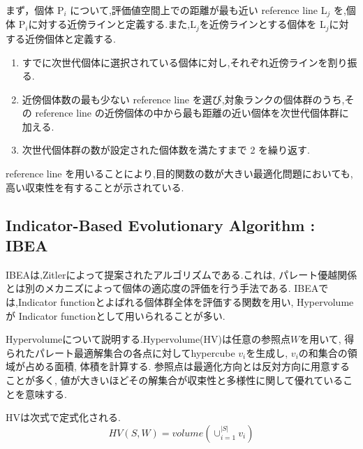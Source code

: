 \documentclass[12pt,a4j,notitlepage]{jreport}
\begin{document}
まず，個体 P$_i$ について,評価値空間上での距離が最も近い reference line L$_j$ を,個体 P$_i$に対する近傍ラインと定義する.また,L$_j$を近傍ラインとする個体を L$_j$に対する近傍個体と定義する.

\begin{enumerate}
\item すでに次世代個体に選択されている個体に対し,それぞれ近傍ラインを割り振る.
\item 近傍個体数の最も少ない reference line を選び,対象ランクの個体群のうち,その reference line の近傍個体の中から最も距離の近い個体を次世代個体群に加える.
\item 次世代個体群の数が設定された個体数を満たすまで 2 を繰り返す.
\end{enumerate}

reference line を用いることにより,目的関数の数が大きい最適化問題においても,高い収束性を有することが示されている.\cite{Jain}

\subsection{Indicator-Based Evolutionary Algorithm : IBEA}
IBEA\cite{Zitzler}は,Zitlerによって提案されたアルゴリズムである.これは, パレート優越関係とは別のメカニズによって個体の適応度の評価を行う手法である.
IBEAでは,Indicator functionとよばれる個体群全体を評価する関数を用い, Hypervolume\cite{Deb}が Indicator functionとして用いられることが多い.

Hypervolumeについて説明する.Hypervolume(HV)は任意の参照点$W$を用いて, 得られたパレート最適解集合の各点に対してhypercube $v_i$を生成し, $v_i$の和集合の領域が占める面積, 体積を計算する.
参照点は最適化方向とは反対方向に用意することが多く, 値が大きいほどその解集合が収束性と多様性に関して優れていることを意味する.

HVは次式で定式化される.
\begin{equation}
HV(S,W)=volume(\cup_{i=1}^{|S|} v_i) \label{eq:hv}
\end{equation}
\end{document}
